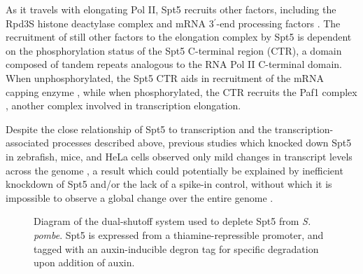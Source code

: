 As it travels with elongating Pol II, Spt5 recruits other factors, including the Rpd3S histone deactylase complex \citep{drouin2010} and mRNA 3$^\prime$-end processing factors \citep{mayer2012, stadelmayer2014, yamamoto2014}.
The recruitment of still other factors to the elongation complex by Spt5 is dependent on the phosphorylation status of the Spt5 C-terminal region (CTR), a domain composed of tandem repeats analogous to the RNA Pol II C-terminal domain.
When unphosphorylated, the Spt5 CTR aids in recruitment of the mRNA capping enzyme \citep{doamekpor2014, doamekpor2015, schneider2010, wen1999}, while when phosphorylated, the CTR recruits the Paf1 complex \citep{liu2009, mbogning2013, wier2013, zhou2009}, another complex involved in transcription elongation.

Despite the close relationship of Spt5 to transcription and the transcription-associated processes described above, previous studies which knocked down Spt5 in zebrafish, mice, and HeLa cells observed only mild changes in transcript levels across the genome \citep{diamant2016b, komori2009, krishnan2008, stanlie2012}, a result which could potentially be explained by inefficient knockdown of Spt5 and/or the lack of a spike-in control, without which it is impossible to observe a global change over the entire genome \citep{chen2016}.

\begin{wrapfigure}[11]{r}{3in}
    \caption[Diagram of the dual-shutoff system used to deplete Spt5 from \textit{S. pombe}]{Diagram of the dual-shutoff system used to deplete Spt5 from \textit{S. pombe}. Spt5 is expressed from a thiamine-repressible promoter, and tagged with an auxin-inducible degron tag for specific degradation upon addition of auxin.}
    \label{fig:five_depletion_diagram}
\end{wrapfigure}

